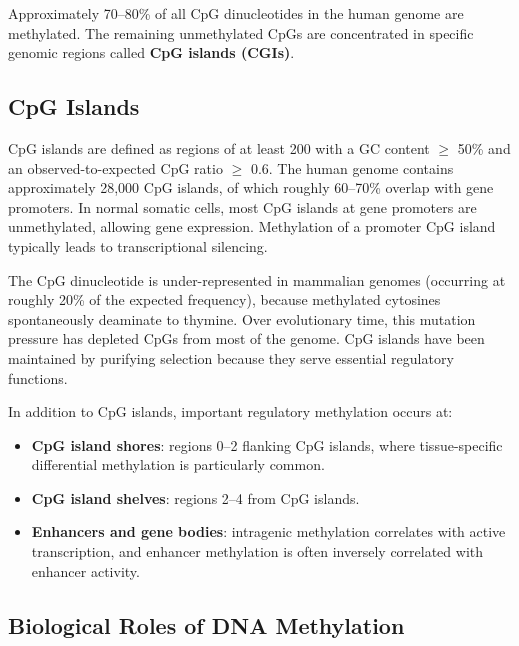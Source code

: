 Approximately 70--80\% of all CpG dinucleotides in the human genome are methylated. The remaining unmethylated CpGs are concentrated in specific genomic regions called \textbf{CpG islands (CGIs)}.

\subsection{CpG Islands}
\label{subsec:methylation:cpg-islands}

CpG islands are defined as regions of at least 200\basepair{} with a GC content $\geq$ 50\% and an observed-to-expected CpG ratio $\geq$ 0.6. The human genome contains approximately 28,000 CpG islands, of which roughly 60--70\% overlap with gene promoters. In normal somatic cells, most CpG islands at gene promoters are unmethylated, allowing gene expression. Methylation of a promoter CpG island typically leads to transcriptional silencing.

\begin{keyconcept}[title={CpG Depletion in the Genome}]
The CpG dinucleotide is under-represented in mammalian genomes (occurring at roughly 20\% of the expected frequency), because methylated cytosines spontaneously deaminate to thymine. Over evolutionary time, this mutation pressure has depleted CpGs from most of the genome. CpG islands have been maintained by purifying selection because they serve essential regulatory functions.
\end{keyconcept}

In addition to CpG islands, important regulatory methylation occurs at:
\begin{itemize}[itemsep=2pt]
  \item \textbf{CpG island shores}: regions 0--2\kilobase{} flanking CpG islands, where tissue-specific differential methylation is particularly common.
  \item \textbf{CpG island shelves}: regions 2--4\kilobase{} from CpG islands.
  \item \textbf{Enhancers and gene bodies}: intragenic methylation correlates with active transcription, and enhancer methylation is often inversely correlated with enhancer activity.
\end{itemize}

\subsection{Biological Roles of DNA Methylation}
\label{subsec:methylation:biological-roles}

